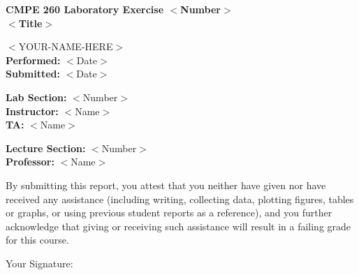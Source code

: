 \documentclass[letterpaper]{article}
\begin{document}
	
	\begin{adjustwidth*}{2cm}{2cm} %
		
		\begin{center}
		\textbf{CMPE 260 Laboratory Exercise $<$Number$>$ \\ %
				\vspace{0.5cm} 
				$<$Title$>$}
		\end{center}
	
		\vspace{12cm} %
		
		\tabto{8cm} $<$YOUR-NAME-HERE$>$ \\ %
		\tabto{8cm} \textbf{Performed: }$<$Date$>$ \\ %
		\tabto{8cm} \textbf{Submitted: }$<$Date$>$  %
				
		\tabto{8cm} \textbf{Lab Section: }$<$Number$>$ \\ %
		\tabto{8cm} \textbf{Instructor: }$<$Name$>$ \\ %
		\tabto{8cm} \textbf{TA: }$<$Name$>$ %
				
		\tabto{8cm} \textbf{Lecture Section: }$<$Number$>$ \\ %
		\tabto{8cm} \textbf{Professor: }$<$Name$>$ %
		
		\vspace{0.5cm}
		
		\noindent By submitting this report, you attest that you neither have given nor have received any assistance (including writing, collecting data, plotting figures, tables or graphs, or using previous student reports as a reference), and you further acknowledge that giving or receiving such assistance will result in a failing grade for this course.
		
		\vspace{0.5cm}
		
		\tabto{1.5cm} Your Signature: \hrulefill %
	
	\end{adjustwidth*}	
	
\end{document}
